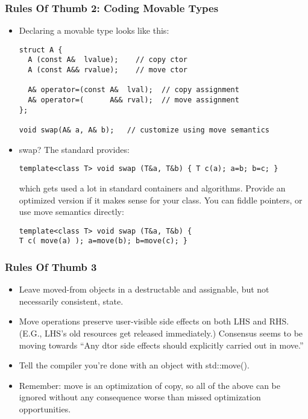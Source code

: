 
\begin{frame}[fragile]
\frametitle {Rules Of Thumb 2: Coding Movable Types}
\begin{itemize}[<+->]
\item Declaring a movable type looks like this:
{\scriptsize
\begin{verbatim}
struct A {
  A (const A&  lvalue);    // copy ctor
  A (const A&& rvalue);    // move ctor

  A& operator=(const A&  lval);  // copy assignment
  A& operator=(      A&& rval);  // move assignment
};

void swap(A& a, A& b);   // customize using move semantics

\end{verbatim}
}

\vskip 6pt


\item swap?    The standard provides:
{\scriptsize
\begin{verbatim}
template<class T> void swap (T&a, T&b) { T c(a); a=b; b=c; }
\end{verbatim}
}
which gets used a lot in standard containers and algorithms.  Provide
an optimized version if it makes sense for your class.  You can fiddle
pointers, or use move semantics directly:
{\scriptsize
\begin{verbatim}
template<class T> void swap (T&a, T&b) { 
T c( move(a) ); a=move(b); b=move(c); }
\end{verbatim}
}

\end{itemize}
\end{frame}




\begin{frame}[fragile]
\frametitle{Rules Of Thumb 3}
\begin{itemize}
\item Leave moved-from objects in a destructable and assignable, but
  not necessarily consistent, state.
\item Move operations preserve user-visible side effects on both LHS
and RHS. (E.G., LHS's old resources get released immediately.)
Consensus seems to be moving towards 
``Any dtor side effects should explicitly carried out in move.''

\item Tell the compiler you're done with an object with std::move().
\item Remember: move is an optimization of copy, so all of the above
  can be ignored without any consequence worse than missed
  optimization opportunities.
\end{itemize}

\end{frame}
